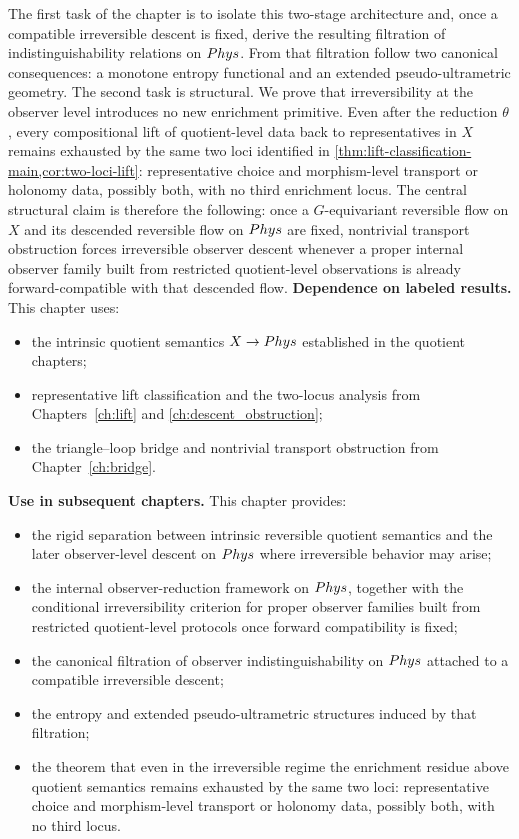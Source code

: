 The first task of the chapter is to isolate this two-stage architecture
and, once a compatible irreversible descent is fixed, derive the
resulting filtration of indistinguishability relations on \(Phys\).
From that filtration follow two canonical consequences:
a monotone entropy functional and an extended pseudo-ultrametric
geometry.
The second task is structural. We prove that irreversibility at the
observer level introduces no new enrichment primitive. Even after the
reduction \(\theta\), every compositional lift of quotient-level data
back to representatives in \(X\) remains exhausted by the same two loci
identified in
\cref{thm:lift-classification-main,cor:two-loci-lift}: representative
choice and morphism-level transport or holonomy data, possibly both,
with no third enrichment locus.
The central structural claim is therefore the following: once a
\(G\)-equivariant reversible flow on \(X\) and its descended reversible
flow on \(Phys\) are fixed, nontrivial transport obstruction forces
irreversible observer descent whenever a proper internal observer
family built from restricted quotient-level observations is already
forward-compatible with that descended flow.
\medskip
\noindent
\textbf{Dependence on labeled results.}
This chapter uses:
\begin{itemize}
	\item the intrinsic quotient semantics \(X\to Phys\) established in the
	      quotient chapters;
	\item representative lift classification and the two-locus analysis from
	      Chapters~\ref{ch:lift} and \ref{ch:descent_obstruction};
	\item the triangle--loop bridge and nontrivial transport obstruction
	      from Chapter~\ref{ch:bridge}.
\end{itemize}
\medskip
\noindent
\textbf{Use in subsequent chapters.}
This chapter provides:
\begin{itemize}
	\item the rigid separation between intrinsic reversible quotient
	      semantics and the later observer-level descent on \(Phys\) where
	      irreversible behavior may arise;
	\item the internal observer-reduction framework on \(Phys\),
	      together with the conditional irreversibility criterion for
	      proper observer families built from restricted quotient-level
	      protocols once forward compatibility is fixed;
	\item the canonical filtration of observer indistinguishability on
	      \(Phys\) attached to a compatible irreversible descent;
	\item the entropy and extended pseudo-ultrametric structures induced
	      by that filtration;
	\item the theorem that even in the irreversible regime the
	      enrichment residue above quotient semantics remains exhausted by
	      the same two loci: representative choice and morphism-level
	      transport or holonomy data, possibly both, with no third locus.
\end{itemize}
